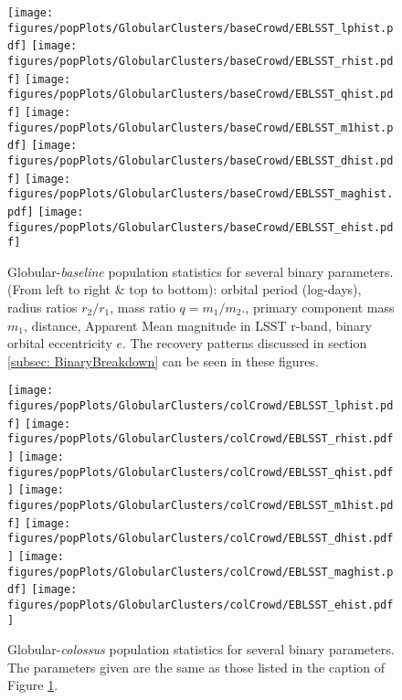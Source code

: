\documentclass[twocolumn]{aastex63}
\begin{document}
\begin{figure*}[p]
    \centering
    \texttt{[image: figures/popPlots/GlobularClusters/baseCrowd/EBLSST\_lphist.pdf]}
    \texttt{[image: figures/popPlots/GlobularClusters/baseCrowd/EBLSST\_rhist.pdf]} 
    \texttt{[image: figures/popPlots/GlobularClusters/baseCrowd/EBLSST\_qhist.pdf]} 
    \texttt{[image: figures/popPlots/GlobularClusters/baseCrowd/EBLSST\_m1hist.pdf]} 
    \texttt{[image: figures/popPlots/GlobularClusters/baseCrowd/EBLSST\_dhist.pdf]}
    \texttt{[image: figures/popPlots/GlobularClusters/baseCrowd/EBLSST\_maghist.pdf]} 
    \texttt{[image: figures/popPlots/GlobularClusters/baseCrowd/EBLSST\_ehist.pdf]} 
    \caption{Globular-\textit{baseline} population statistics for several binary parameters. (From left to right \& top to bottom): orbital period (log-days), radius ratios $r_2/r_1$,  mass ratio $q = m_1/m_2$., primary component mass $m_1$,  distance, Apparent Mean magnitude in LSST r-band, binary orbital eccentricity $e$. The recovery patterns discussed in section \ref{subsec: BinaryBreakdown} can be seen in these figures.}
    \label{fig:gbc-hists}
\end{figure*}

\begin{figure*}[p]
        \centering
        \texttt{[image: figures/popPlots/GlobularClusters/colCrowd/EBLSST\_lphist.pdf]} 
        \texttt{[image: figures/popPlots/GlobularClusters/colCrowd/EBLSST\_rhist.pdf]} 
        \texttt{[image: figures/popPlots/GlobularClusters/colCrowd/EBLSST\_qhist.pdf]} 
        \texttt{[image: figures/popPlots/GlobularClusters/colCrowd/EBLSST\_m1hist.pdf]} 
        \texttt{[image: figures/popPlots/GlobularClusters/colCrowd/EBLSST\_dhist.pdf]}
        \texttt{[image: figures/popPlots/GlobularClusters/colCrowd/EBLSST\_maghist.pdf]} 
        \texttt{[image: figures/popPlots/GlobularClusters/colCrowd/EBLSST\_ehist.pdf]} 
    \caption{Globular-\textit{colossus} population statistics for several binary parameters. The parameters given are the same as those listed in the caption of Figure \ref{fig:gbc-hists}.}
    \label{fig:gcc-hists}
\end{figure*}
\end{document}

